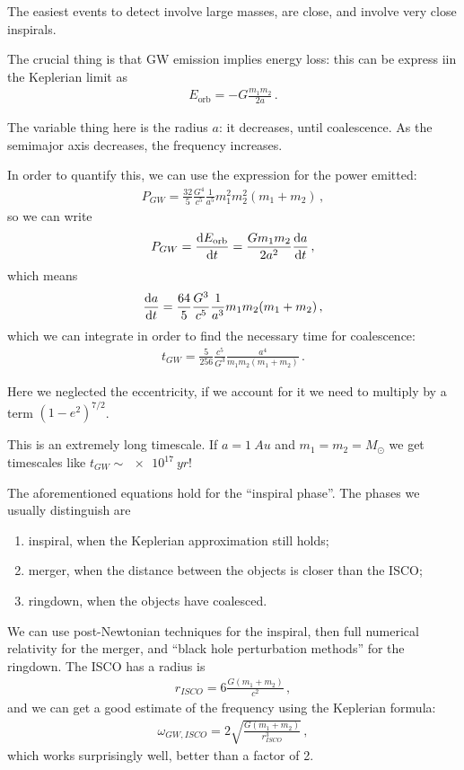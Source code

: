 \documentclass[main.tex]{subfiles}
\begin{document}
The easiest events to detect involve large masses, are close, and involve very close inspirals. 

\medskip

The crucial thing is that GW emission implies energy loss: this can be express iin the Keplerian limit as
%
\begin{align}
E _{\text{orb}} = - G \frac{m_1 m_2 }{2a}
\,.
\end{align}

The variable thing here is the radius \(a\): it decreases, until coalescence. 
As the semimajor axis decreases, the frequency increases. 

In order to quantify this, we can use the expression for the power emitted: 
%
\begin{align}
P_{GW} = \frac{32}{5} \frac{G^{4}}{c^{5}}
\frac{1}{a^{5}} m_1^2 m_2^2 (m_1 +m_2 )
\,,
\end{align}
%
so we can write 
%
\begin{align}
P_{GW} = \dv{E _{\text{orb}}}{t} = \frac{Gm_1 m_2 }{2a^2} \dv{a}{t}
\,,
\end{align}
%
which means 
%
\begin{align}
\dv{a}{t} = \frac{64}{5} \frac{G^3}{c^{5}} \frac{1}{a^3} m_1 m_2 (m_1 + m_2 )
\,,
\end{align}
%
which we can integrate in order to find the necessary time for coalescence: 
%
\begin{align}
t_{GW} = \frac{5}{256} \frac{c^{5}}{G^{3}} \frac{a^{4}}{m_1 m_2 (m_1 + m_2 )}
\,.
\end{align}

Here we neglected the eccentricity, if we account for it we need to multiply by a term \((1- e^2)^{7/2}\). 

This is an extremely long timescale. If \(a = \SI{1}{Au}\) and \(m_1 = m_2 = M_{\odot}\) we get timescales like \(t_{GW} \sim \SI{e17}{yr}\)!

The aforementioned equations hold for the ``inspiral phase''. The phases we usually distinguish are 
\begin{enumerate}
  \item inspiral, when the Keplerian approximation still holds;
  \item merger, when the distance between the objects is closer than the ISCO;
  \item ringdown, when the objects have coalesced.
\end{enumerate}

We can use post-Newtonian techniques for the inspiral, then full numerical relativity for the merger, and ``black hole perturbation methods'' for the ringdown. 
The ISCO has a radius is 
%
\begin{align}
r_{ISCO} = 6 \frac{G (m_1 + m_2 )}{c^2}
\,,
\end{align}
%
and we can get a good estimate of the frequency using the Keplerian formula: 
%
\begin{align}
\omega_{GW, ISCO} = 2 \sqrt{ \frac{G (m_1 + m_2 )}{r_{ISCO}^3}}
\,,
\end{align}
%
which works surprisingly well, better than a factor of 2. 
\end{document}
